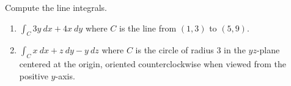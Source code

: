 \documentclass[12pt,reqno]{amsart}
\begin{document}
\prob Compute the line integrals.

\medskip
\begin{enumerate}
\item $\displaystyle\int_C 3y \ dx + 4x \ dy$ where $C$ is the line from $(1,3)$ to $(5,9)$.\vfill
\item $\displaystyle\int_C x \ dx + z \ dy - y \ dz$ where $C$ is the circle of radius $3$ in the $yz$-plane centered at the origin, oriented counterclockwise when viewed from the positive $y$-axis.\vfill
\end{enumerate}
\end{document}
